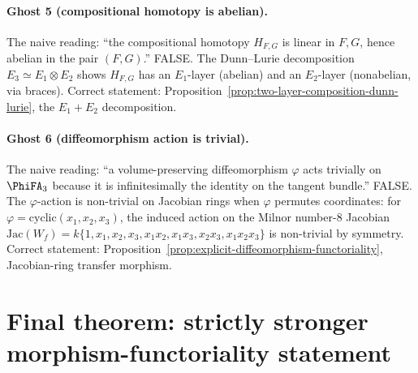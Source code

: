 \paragraph{Ghost 5 (compositional homotopy is abelian).}  The naive
reading: ``the compositional homotopy $H_{F, G}$ is linear in $F, G$,
hence abelian in the pair $(F, G)$.''  FALSE.  The Dunn--Lurie
decomposition $E_3 \simeq E_1 \otimes E_2$ shows $H_{F, G}$ has an
$E_1$-layer (abelian) and an $E_2$-layer (nonabelian, via braces).
Correct statement:
Proposition~\ref{prop:two-layer-composition-dunn-lurie}, the
$E_1 + E_2$ decomposition.

\paragraph{Ghost 6 (diffeomorphism action is trivial).}  The naive
reading: ``a volume-preserving diffeomorphism $\varphi$ acts trivially
on $\PhiFA_3$ because it is infinitesimally the identity on the
tangent bundle.''  FALSE.  The $\varphi$-action is non-trivial on
Jacobian rings when $\varphi$ permutes coordinates: for $\varphi =
\mathrm{cyclic}(x_1, x_2, x_3)$, the induced action on the Milnor
number-$8$ Jacobian $\mathrm{Jac}(W_f) = k\{1, x_1, x_2, x_3, x_1x_2,
x_1x_3, x_2x_3, x_1x_2x_3\}$ is non-trivial by symmetry.  Correct
statement: Proposition~\ref{prop:explicit-diffeomorphism-functoriality},
Jacobian-ring transfer morphism.

\section*{Final theorem: strictly stronger morphism-functoriality statement}

